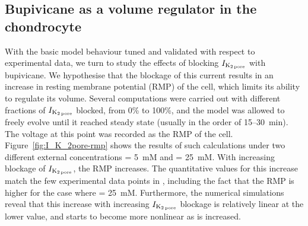 \subsection*{Bupivicane as a volume regulator in the chondrocyte}

With the basic model behaviour tuned and validated with respect to
experimental data, we turn to study the effects of blocking $I_{\rm
  K_{2\, pore}}$ with bupivicane. We hypothesise that the blockage of
this current results in an increase in resting membrane potential
(RMP) of the cell, which limits its ability to regulate its
volume. Several computations were carried out with different
fractions of $I_{\rm K_{2\, pore}}$ blocked, from 0\% to 100\%, and
the model was allowed to freely evolve until it reached steady state
(usually in the order of 15--30~min). The voltage at this point was
recorded as the RMP of the cell. Figure~\ref{fig:I_K_2pore-rmp} shows
the results of such calculations under two different external
concentrations \Ko = 5~mM and \Ko = 25~mM. With increasing blockage of
$I_{\rm K_{2\, pore}}$, the RMP increases. The quantitative values for
this increase match the few experimental data points in
\citet{Clarketal2011}, including the fact that the RMP is higher for
the case where \Ko = 25~mM. Furthermore, the numerical simulations
reveal that this increase with increasing $I_{\rm K_{2\, pore}}$
blockage is relatively linear at the lower \Ko{} value, and starts to
become more nonlinear as \Ko{} is increased.

